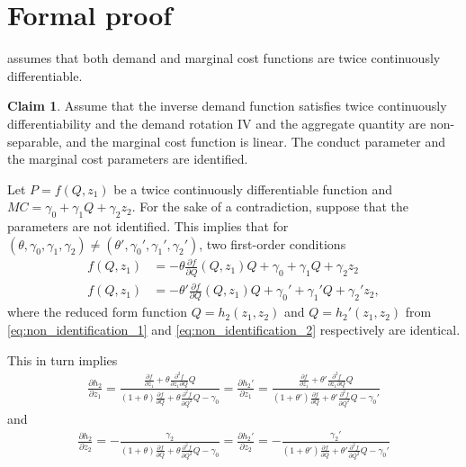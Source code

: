 \documentclass[11pt, a4paper]{article}
\numberwithin{figure}{section}
\theoremstyle{definition}
\newcommand{\0}{\mathbf{0}}
\newtheorem{claim}{Claim}
\begin{document}
\section{Formal proof}
\citet{lau1982identifying} assumes that both demand and marginal cost functions are twice continuously differentiable.

\begin{claim}
Assume that the inverse demand function satisfies twice continuously differentiability and the demand rotation IV and the aggregate quantity are non-separable, and the marginal cost function is linear. The conduct parameter and the marginal cost parameters are identified.
\end{claim}

Let $P = f(Q,z_1)$ be a twice continuously differentiable function and $MC = \gamma_0 + \gamma_1 Q + \gamma_2 z_2$.
For the sake of a contradiction, suppose that the parameters are not identified. This implies that for $(\theta, \gamma_0, \gamma_1, \gamma_2)\ne (\theta', \gamma_0', \gamma_1', \gamma_2')$, two first-order conditions
\begin{align}
    f(Q,z_1) &= - \theta \frac{\partial f}{\partial Q}(Q,z_1) Q + \gamma_0 + \gamma_1 Q + \gamma_2 z_2 \label{eq:non_identification_1}\\
    f(Q,z_1) &= - \theta' \frac{\partial f}{\partial Q}(Q,z_1) Q + \gamma_0' + \gamma_1' Q + \gamma_2' z_2 \label{eq:non_identification_2},
\end{align}
where the reduced form function $Q= h_2(z_1,z_2)$ and $Q= h_2'(z_1,z_2)$ from \eqref{eq:non_identification_1} and \eqref{eq:non_identification_2} respectively are identical.





This in turn implies
\begin{align}\label{eq:equivalence_1}
    \frac{\partial h_2}{\partial z_1} = \frac{\frac{\partial f}{\partial z_1} + \theta \frac{\partial^2 f}{\partial z_1\partial Q}Q}{(1 + \theta)\frac{\partial f}{\partial Q} + \theta \frac{\partial^2 f}{\partial Q^2}Q - \gamma_0} = \frac{\partial h_2'}{\partial z_1} = \frac{\frac{\partial f}{\partial z_1} + \theta' \frac{\partial^2 f}{\partial z_1\partial Q}Q}{(1 + \theta')\frac{\partial f}{\partial Q} + \theta' \frac{\partial^2 f}{\partial Q^2}Q - \gamma_0'}
\end{align}
and 
\begin{align}\label{eq:equivalence_2}
    \frac{\partial h_2}{\partial z_2} = -\frac{\gamma_2}{(1 + \theta)\frac{\partial f}{\partial Q} + \theta \frac{\partial^2 f}{\partial Q^2}Q - \gamma_0} = \frac{\partial h_2'}{\partial z_2} = -\frac{\gamma_2'}{(1 + \theta')\frac{\partial f}{\partial Q} + \theta' \frac{\partial^2 f}{\partial Q^2}Q - \gamma_0'}
\end{align}
\end{document}
